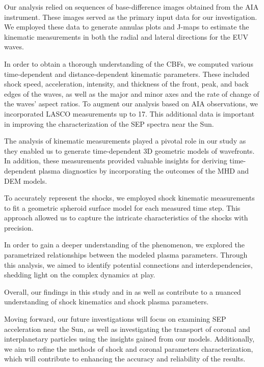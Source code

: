 Our analysis relied on sequences of base-difference images obtained from the AIA instrument. These images served as the primary input data for our investigation. We employed these data to generate annulas plots and J-maps to estimate the kinematic measurements in both the radial and lateral directions for the EUV waves.

In order to obtain a thorough understanding of the CBFs, we computed various time-dependent and distance-dependent kinematic parameters. These included shock speed, acceleration, intensity, and thickness of the front, peak, and back edges of the waves, as well as the major and minor axes and the rate of change of the waves' aspect ratios. To augment our analysis based on AIA observations, we incorporated LASCO measurements up to 17\rsun. This additional data is important in improving the characterization of the SEP spectra near the Sun.

The analysis of kinematic measurements played a pivotal role in our study as they enabled us to generate time-dependent 3D geometric models of wavefronts. In addition, these measurements provided valuable insights for deriving time-dependent plasma diagnostics by incorporating the outcomes of the MHD and DEM models.

To accurately represent the shocks, we employed shock kinematic measurements to fit a geometric spheroid surface model for each measured time step. This approach allowed us to capture the intricate characteristics of the shocks with precision.

In order to gain a deeper understanding of the phenomenon, we explored the parametrized relationships between the modeled plasma parameters. Through this analysis, we aimed to identify potential connections and interdependencies, shedding light on the complex dynamics at play.

Overall, our findings in this study and in \cite{kozarev_2022} as well as \cite{stepanyuk_2022} contribute to a nuanced understanding of shock kinematics and shock plasma parameters.

Moving forward, our future investigations will focus on examining SEP acceleration near the Sun, as well as investigating the transport of coronal and interplanetary particles using the insights gained from our models. Additionally, we aim to refine the methods of shock and coronal parameters characterization, which will contribute to enhancing the accuracy and reliability of the results.




